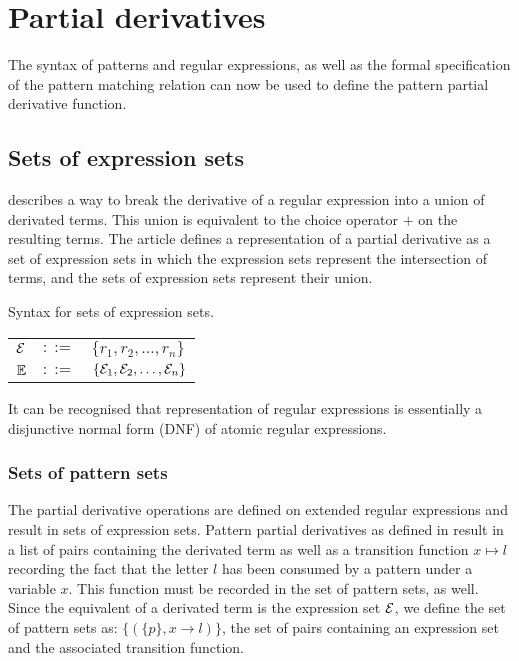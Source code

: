 \section{Partial derivatives}
\label{exprsets}

The syntax of patterns and regular expressions, as well as the formal
specification of the pattern matching relation can now be used to define the
pattern partial derivative function.

\subsection{Sets of expression sets}

\cite{pd-ere} describes a way to break the derivative of a regular expression
into a union of derivated terms. This union is equivalent to the choice operator
$+$ on the resulting terms. The article defines a representation of a partial
derivative as a set of expression sets in which the expression sets represent
the intersection of terms, and the sets of expression sets represent their
union.

\begin{defn}
   Syntax for sets of expression sets.

   \begin{tabular}{lll}
      $\mathcal{E}$	& $::=$ & $\{r_1, r_2, \dots, r_n\}$ \\
      $\mathbb{E}$	& $::=$ & $\{\mathcal{E}_1, \mathcal{E}_2, \dots, \mathcal{E}_n\}$ \\
   \end{tabular}
\end{defn}

It can be recognised that representation of regular expressions is essentially a
disjunctive normal form (DNF) of atomic regular expressions.


\subsubsection{Sets of pattern sets}

The partial derivative operations are defined on extended regular expressions
and result in sets of expression sets. Pattern partial derivatives as defined in
\cite{pd-pat} result in a list of pairs containing the derivated term as well as
a transition function $x \mapsto l$ recording the fact that the letter $l$ has
been consumed by a pattern under a variable $x$. This function must be recorded
in the set of pattern sets, as well. Since the equivalent of a derivated term is
the expression set $\mathcal{E}$, we define the set of pattern sets as: $\{ (\{ p \},
x \to l) \}$, the set of pairs containing an expression set and the associated
transition function.


